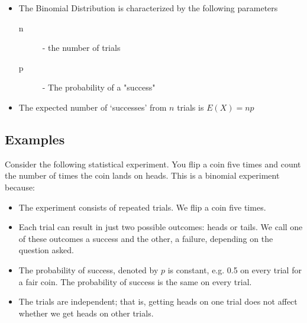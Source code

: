 \documentclass[a4paper,12pt]{article}
\begin{document}
%



%
%
%
%
%













\begin{itemize}
	\item The Binomial Distribution is characterized by the following parameters
	
	
	\begin{description}
		\item[n] - the number of trials
		
		\item[p] - The probability of a "success"
	\end{description}	
	
	\item The expected number of `successes' from $n$ trials is $E(X) = np$


	\end{itemize}
\subsection*{Examples}
Consider the following statistical experiment. You flip a coin five times and count the number of times the coin lands on heads. This is a binomial experiment because:
\begin{itemize}
\item The experiment consists of repeated trials. We flip a coin five times.
\item Each trial can result in just two possible outcomes: heads or tails. We call one of these outcomes a success and the other, a failure, depending on the question asked.

\item The probability of success, denoted by $p$ is constant, e.g. 0.5 on every trial for a fair coin. The probability of success is the same on every trial.
\item The trials are independent; that is, getting heads on one trial does not affect whether we get heads on other trials.
\end{itemize}
\end{document}
